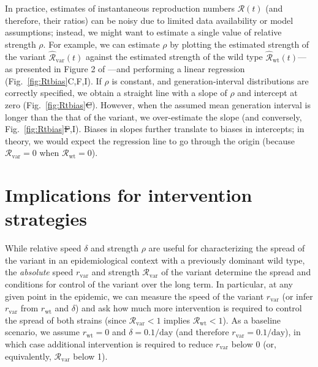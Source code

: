 \documentclass[12pt]{article}
\newcommand{\fref}[1]{Fig.~\ref{fig:#1}}
\newcommand{\vvvar}{\mathrm{var}}
\newcommand{\wwwt}{\mathrm{wt}}
\newcommand{\rx}[1]{\ensuremath{{r}_{#1}}\xspace}
\newcommand{\rw}{\rx{\wwwt}}
\newcommand{\rv}{\rx{\vvvar}}
\newcommand{\Rx}[1]{\ensuremath{{\mathcal R}_{#1}}\xspace}
\newcommand{\RR}{\ensuremath{{\mathcal R}}\xspace}
\newcommand{\Rw}{\Rx{\wwwt}}
\newcommand{\Rv}{\Rx{\vvvar}}
\newcommand{\pday}{\ensuremath{/\textrm{day}}}
\providecommand{\DIFaddtex}[1]{{\protect\color{blue}\uwave{#1}}} %
\providecommand{\DIFdeltex}[1]{{\protect\color{red}\sout{#1}}}                      %
\providecommand{\DIFaddbegin}{} %
\providecommand{\DIFaddend}{} %
\providecommand{\DIFdelbegin}{} %
\providecommand{\DIFdelend}{} %
\providecommand{\DIFadd}[1]{\texorpdfstring{\DIFaddtex{#1}}{#1}} %
\providecommand{\DIFdel}[1]{\texorpdfstring{\DIFdeltex{#1}}{}} %
\newcommand{\DIFscaledelfig}{0.5}
\newlength{\DIFdelgraphicswidth} %
\newlength{\DIFdelgraphicsheight} %
\newcommand{\DIFaddincludegraphics}[2][]{{\color{blue}\fbox{\DIFOincludegraphics[#1]{#2}}}} %
\newcommand{\DIFdelincludegraphics}[2][]{%
\sbox{\DIFdelgraphicsbox}{\DIFOincludegraphics[#1]{#2}}%
\settoboxwidth{\DIFdelgraphicswidth}{\DIFdelgraphicsbox} %
\settoboxtotalheight{\DIFdelgraphicsheight}{\DIFdelgraphicsbox} %
\scalebox{\DIFscaledelfig}{%
\parbox[b]{\DIFdelgraphicswidth}{\usebox{\DIFdelgraphicsbox}\\[-\baselineskip] \rule{\DIFdelgraphicswidth}{0em}}\llap{\resizebox{\DIFdelgraphicswidth}{\DIFdelgraphicsheight}{%
\setlength{\unitlength}{\DIFdelgraphicswidth}%
\begin{picture}(1,1)%
\thicklines\linethickness{2pt} %
{\color[rgb]{1,0,0}\put(0,0){\framebox(1,1){}}}%
{\color[rgb]{1,0,0}\put(0,0){\line( 1,1){1}}}%
{\color[rgb]{1,0,0}\put(0,1){\line(1,-1){1}}}%
\end{picture}%
}\hspace*{3pt}}} %
} %
\DeclareRobustCommand{\DIFaddbegin}{\DIFOaddbegin \let\includegraphics\DIFaddincludegraphics} %
\DeclareRobustCommand{\DIFaddend}{\DIFOaddend \let\includegraphics\DIFOincludegraphics} %
\DeclareRobustCommand{\DIFdelbegin}{\DIFOdelbegin \let\includegraphics\DIFdelincludegraphics} %
\DeclareRobustCommand{\DIFdelend}{\DIFOaddend \let\includegraphics\DIFOincludegraphics} %
\begin{document}
In practice, estimates of instantaneous reproduction numbers $\RR(t)$ (and therefore, their ratios) can be noisy due to limited data availability or model assumptions;
instead, we might want to estimate a single value of relative strength $\rho$.
For example, we can estimate $\rho$ by plotting the estimated strength of the variant $\hat{\RR}_{\textrm{var}}(t)$ against the estimated strength of the wild type $\hat{\RR}_{\textrm{wt}}(t)$---as presented in Figure 2 of \cite{volz2021transmission}---and performing a linear regression (\fref{Rtbias}C,F,I).
If $\rho$ is constant, and generation-interval distributions are correctly specified, we obtain a straight line with a slope of $\rho$ and intercept at zero (\fref{Rtbias}\DIFdelbegin \DIFdel{C}\DIFdelend \DIFaddbegin \DIFadd{F}\DIFaddend ).
However, when the assumed mean generation interval is longer than the that of the variant, we over-estimate the slope (and conversely, \fref{Rtbias}\DIFdelbegin \DIFdel{F}\DIFdelend \DIFaddbegin \DIFadd{C}\DIFaddend ,I).
Biases in slopes further translate to biases in intercepts; in theory, we would expect the regression line to go through the origin (because $\Rv = 0$ when $\Rw = 0$).

\section{Implications for intervention strategies}

While relative speed $\delta$ and strength $\rho$ are useful for characterizing the spread of the variant in an epidemiological context with a previously dominant wild type, the \emph{absolute} speed $\rv$ and strength $\Rv$ of the variant determine the spread and conditions for control of the variant over the long term.
In particular, at any given point in the epidemic, we can measure the speed of the variant $\rv$ (or infer $\rv$ from $\rw$ and $\delta$) and ask how much more intervention is required to control the spread of both strains (since $\Rv < 1$ implies $\Rw < 1$).
As a baseline scenario, we assume $\rw=0$ and $\delta=0.1\pday$ (and therefore $\rv=0.1\pday$), in which case additional intervention is required to reduce $\rv$ below 0 (or, equivalently, $\Rv$ below 1).
\end{document}
